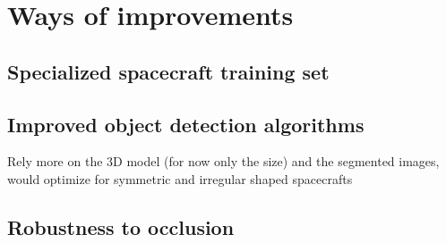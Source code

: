 
\chapter{Ways of improvements}\label{chapter:ways_of_improvements}

\section{Specialized spacecraft training set}
\section{Improved object detection algorithms}
Rely more on the 3D model (for now only the size) and the segmented images, would optimize for symmetric and irregular shaped spacecrafts
\section{Robustness to occlusion}